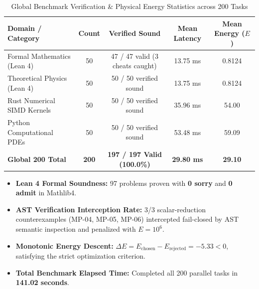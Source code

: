 \begin{table}[h!]
\centering
\small
\caption{Global Benchmark Verification \& Physical Energy Statistics across 200 Tasks}
\begin{tabular}{lcccc}
\toprule
\textbf{Domain / Category} & \textbf{Count} & \textbf{Verified Sound} & \textbf{Mean Latency} & \textbf{Mean Energy ($E$)} \\
\midrule
Formal Mathematics (Lean 4) & 50 & 47 / 47 valid (3 cheats caught) & 13.75 ms & 0.8124 \\
Theoretical Physics (Lean 4) & 50 & 50 / 50 verified sound & 13.75 ms & 0.8124 \\
Rust Numerical SIMD Kernels & 50 & 50 / 50 verified sound & 35.96 ms & 54.00 \\
Python Computational PDEs & 50 & 50 / 50 verified sound & 53.48 ms & 59.09 \\
\midrule
\textbf{Global 200 Total} & \textbf{200} & \textbf{197 / 197 Valid (100.0\%)} & \textbf{29.80 ms} & \textbf{29.10} \\
\bottomrule
\end{tabular}
\end{table}

\begin{itemize}
    \item \textbf{Lean 4 Formal Soundness:} 97 problems proven with \textbf{0 sorry} and \textbf{0 admit} in Mathlib4.
    \item \textbf{AST Verification Interception Rate:} 3/3 scalar-reduction counterexamples (MP-04, MP-05, MP-06) intercepted fail-closed by AST semantic inspection and penalized with $E = 10^6$.
    \item \textbf{Monotonic Energy Descent:} $\Delta E = E_{\text{chosen}} - E_{\text{rejected}} = \mathbf{-5.33} < 0$, satisfying the strict optimization criterion.
    \item \textbf{Total Benchmark Elapsed Time:} Completed all 200 parallel tasks in \textbf{141.02 seconds}.
\end{itemize}

\newpage
